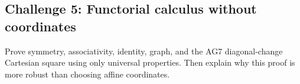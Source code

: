 \subsection*{Challenge 5: Functorial calculus without coordinates}
\begin{problem}\label{chal:vi23-05}
Prove symmetry, associativity, identity, graph, and the AG7 diagonal-change Cartesian square using only universal properties. Then explain why this proof is more robust than choosing affine coordinates.
\end{problem}
